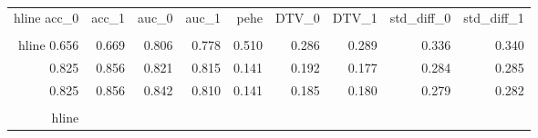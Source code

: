 \begin{table}[h]
\centering
\caption{}
\label{wd_para_6.0_wd_258.3604736328125}
\begin{tabular}{rrrrrrrrr}
\\hline
 acc\_0 &  acc\_1 &  auc\_0 &  auc\_1 &  pehe &  DTV\_0 &  DTV\_1 &  std\_diff\_0 &  std\_diff\_1 \\
\\hline
 0.656 &  0.669 &  0.806 &  0.778 & 0.510 &  0.286 &  0.289 &       0.336 &       0.340 \\
 0.825 &  0.856 &  0.821 &  0.815 & 0.141 &  0.192 &  0.177 &       0.284 &       0.285 \\
 0.825 &  0.856 &  0.842 &  0.810 & 0.141 &  0.185 &  0.180 &       0.279 &       0.282 \\
\\hline
\end{tabular}
\end{table}
